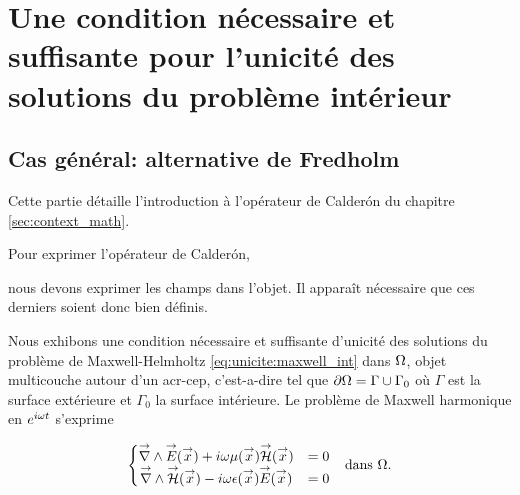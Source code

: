 \section[Une CNS pour l'unicité des solutions de Maxwell intérieur]{Une condition nécessaire et suffisante pour l'unicité des solutions du problème intérieur}
  \subsection{Cas général: alternative de Fredholm}

    Cette partie détaille l'introduction à l'opérateur de Calderón du chapitre \ref{sec:context_math}.


    Pour exprimer l'opérateur de Calderón,

    nous devons exprimer les champs dans l'objet. Il apparaît nécessaire que ces derniers soient donc bien définis.

    Nous exhibons une condition nécessaire et suffisante d'unicité des solutions du problème de Maxwell-Helmholtz  \eqref{eq:unicite:maxwell_int} dans \(\Omega\), objet multicouche autour d'un \gls{acr-cep}, c'est-a-dire tel que \(\partial \Omega = \Gamma \cup \Gamma_0\) où \(\Gamma\) est la surface extérieure et \(\Gamma_0\) la surface intérieure. Le problème de Maxwell harmonique en \(e^{i\omega t}\) s'exprime

    \begin{align}
    \left\lbrace
      \begin{matrix}
        {\overset{\rightarrow}{\nabla}}\wedge {\overset{\rightarrow}{E}}({\overset{\rightarrow}{x}}) + i \omega\mu({\overset{\rightarrow}{x}}) {\overset{\rightarrow}{\mathcal{H}}}({\overset{\rightarrow}{x}}) &= 0
        \\
        {\overset{\rightarrow}{\nabla}}\wedge {\overset{\rightarrow}{\mathcal{H}}}({\overset{\rightarrow}{x}}) - i \omega\epsilon({\overset{\rightarrow}{x}}) {\overset{\rightarrow}{E}}({\overset{\rightarrow}{x}}) &= 0
      \end{matrix}
      \right. && \text{dans \(\Omega\).}
      \label{eq:unicite:maxwell_int}
    \end{align}


